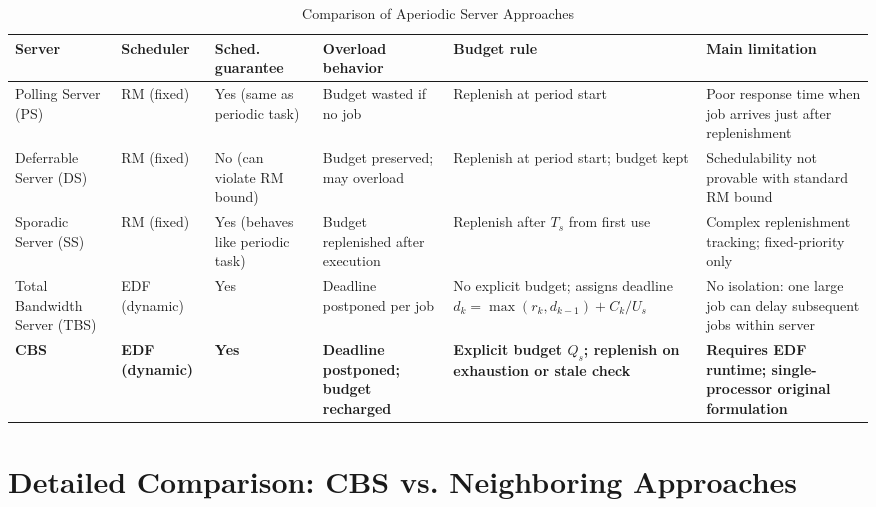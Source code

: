 \documentclass[conference]{IEEEtran}
\begin{document}
\begin{table}[t]
\centering
\caption{Comparison of Aperiodic Server Approaches}
\label{tab:comparison}
\renewcommand{\arraystretch}{1.3}
\begin{tabular}{|p{2.2cm}|p{1.8cm}|p{2.0cm}|p{2.5cm}|p{2.5cm}|p{2.8cm}|}
\hline
\textbf{Server} & \textbf{Scheduler} & \textbf{Sched. guarantee} &
\textbf{Overload behavior} & \textbf{Budget rule} &
\textbf{Main limitation} \\
\hline
Polling Server (PS) &
RM (fixed) &
Yes (same as periodic task) &
Budget wasted if no job &
Replenish at period start &
Poor response time when job arrives just after replenishment \\
\hline
Deferrable Server (DS) &
RM (fixed) &
No (can violate RM bound) &
Budget preserved; may overload &
Replenish at period start; budget kept &
Schedulability not provable with standard RM bound \\
\hline
Sporadic Server (SS) &
RM (fixed) &
Yes (behaves like periodic task) &
Budget replenished after execution &
Replenish after $T_s$ from first use &
Complex replenishment tracking; fixed-priority only \\
\hline
Total Bandwidth Server (TBS) &
EDF (dynamic) &
Yes &
Deadline postponed per job &
No explicit budget; assigns deadline $d_k = \max(r_k, d_{k-1}) + C_k/U_s$ &
No isolation: one large job can delay subsequent jobs within server \\
\hline
\textbf{CBS} &
\textbf{EDF (dynamic)} &
\textbf{Yes} &
\textbf{Deadline postponed; budget recharged} &
\textbf{Explicit budget $Q_s$; replenish on exhaustion or stale check} &
\textbf{Requires EDF runtime; single-processor original formulation} \\
\hline
\end{tabular}
\end{table}

\section{Detailed Comparison: CBS vs. Neighboring Approaches}
\end{document}
